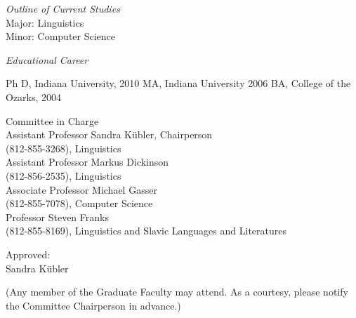 \documentclass[11pt]{article}
\begin{document}
\begin{minipage}[b]{0.5\linewidth}\centering
{\it Outline of Current Studies} \\

Major: Linguistics \\
Minor: Computer Science
\end{minipage}
\begin{minipage}[b]{0.5\linewidth}\centering
{\it Educational Career}

Ph D, Indiana University, 2010
MA, Indiana University 2006
BA, College of the Ozarks, 2004
\end{minipage}

\begin{center}
Committee in Charge \\
Assistant Professor Sandra K\"ubler, Chairperson \\
(812-855-3268), Linguistics \\
Assistant Professor Markus Dickinson \\
(812-856-2535), Linguistics \\
Associate Professor Michael Gasser \\
(812-855-7078), Computer Science \\
Professor Steven Franks \\
(812-855-8169), Linguistics and Slavic Languages and Literatures
\end{center}
\begin{center}
Approved: \hrulefill \\
Sandra K\"ubler
\end{center}

(Any member of the Graduate Faculty may attend. As a courtesy, please
notify the Committee Chairperson in advance.)
\end{document}
